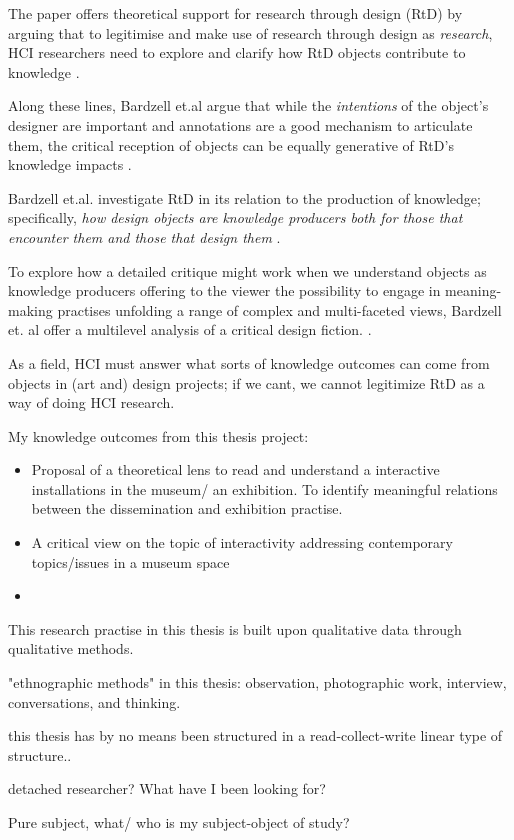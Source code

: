 The paper offers theoretical support for research through design (RtD) by arguing that to legitimise and make use of research through design as \emph{research}, HCI researchers need to explore and clarify how RtD objects contribute to knowledge \autocite[p.2093]{bardzell_immodest_2015}.


Along these lines, Bardzell et.al argue that while the \emph{intentions} of the object's designer are important and annotations are a good mechanism to articulate them, the critical reception of objects can be equally generative of RtD's knowledge impacts \autocite[p. 2093]{bardzell_immodest_2015}.

Bardzell et.al. investigate RtD in its relation to the production of knowledge; specifically, \emph{how design objects are knowledge producers both for those that encounter them and those that design them} \autocite[p. 2093]{bardzell_immodest_2015}. 

To explore how a detailed critique might work when we understand objects as knowledge producers offering to the viewer the possibility to engage in meaning-making practises unfolding a range of complex and multi-faceted views, Bardzell et. al offer a multilevel analysis of a critical design fiction. \autocite[p. 2094]{bardzell_immodest_2015}.

As a field, HCI must answer what sorts of knowledge outcomes can come from objects in (art and) design projects; if we cant, we cannot legitimize RtD as a way of doing HCI research.

My knowledge outcomes from this thesis project:
\begin{itemize}
    \item Proposal of a theoretical lens to read and understand a interactive installations in the museum/ an exhibition. To identify meaningful relations between the dissemination and exhibition practise.
    \item A critical view on the topic of interactivity addressing contemporary topics/issues in a museum space
    \item 
\end{itemize}

This research practise in this thesis is built upon qualitative data through qualitative methods. 

"ethnographic methods" in this thesis: observation, photographic work, interview, conversations, and thinking. 

this thesis has by no means been structured in a read-collect-write linear type of structure.. 

detached researcher? 
What have I been looking for?

Pure subject, what/ who is my subject-object of study?